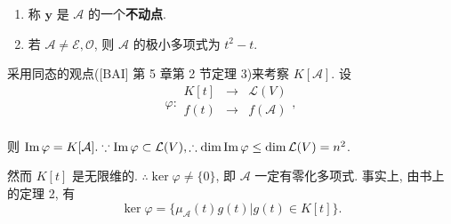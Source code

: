 \documentclass[color=black,device=normal,lang=cn,mode=geye]{elegantnote}
\begin{document}
\begin{note}
    \begin{enumerate}
        \def\labelenumi{(\arabic{enumi})}
        \item 称 $\boldsymbol{y}$ 是 $\mathcal{A}$ 的一个\textbf{不动点}.
        \item 若 $\mathcal{A}\neq\mathcal{E},\mathcal{O}$, 则 $\mathcal{A}$ 的极小多项式为 $t^2-t$.
    \end{enumerate}
\end{note}
采用同态的观点([BAI] 第 5 章第 2 节定理 3)来考察 $K[\mathcal{A}]$. 设
\[\varphi:\begin{array}{rcl}
    K[t] & \to & \mathcal{L}(V) \\
    f(t) & \to & f(\mathcal{A}) \\
\end{array},\]

则 $\operatorname{Im} \varphi=K[\mathcal{A}].\because\operatorname{Im} \varphi\subset\mathcal{L}(V),\therefore\dim\operatorname{Im} \varphi\leq\dim\mathcal{L}(V)=n^2$.

然而 $K[t]$ 是无限维的. $\therefore\ker\varphi\neq\{0\}$, 即 $\mathcal{A}$ 一定有零化多项式. 事实上, 由书上的定理 2, 有
\[\ker\varphi=\{\mu_\mathcal{A}(t)g(t)|g(t)\in K[t]\}.\]
\end{document}
